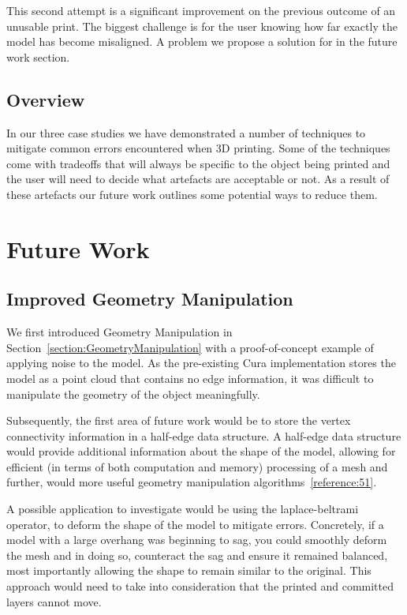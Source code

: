\documentclass[11pt]{report} %
\begin{document}
This second attempt is a significant improvement on the previous outcome of an unusable print. The biggest challenge is for the user knowing how far exactly the model has become misaligned. A problem we propose a solution for in the future work section.   


\section{Overview}
In our three case studies we have demonstrated a number of techniques to mitigate common errors encountered when 3D printing.  Some of the techniques come with tradeoffs that will always be specific to the object being printed and the user will need to decide what artefacts are acceptable or not. As a result of these artefacts our future work outlines some potential ways to reduce them.  




\chapter{Future Work}
\section{Improved Geometry Manipulation}
We first introduced Geometry Manipulation in Section~\ref{section:GeometryManipulation} with a proof-of-concept example of applying noise to the model. As the pre-existing Cura implementation stores the model as a point cloud that contains no edge information, it was difficult to manipulate the geometry of the object meaningfully. 

Subsequently, the first area of future work would be to store the vertex connectivity information in a half-edge data structure. A half-edge data structure would provide additional information about the shape of the model, allowing for efficient (in terms of both computation and memory) processing of a mesh and further, would more useful geometry manipulation algorithms~\ref{reference:51}.

A possible application to investigate would be using the laplace-beltrami operator, to deform the shape of the model to mitigate errors. Concretely, if a model with a large overhang was beginning to sag, you could smoothly deform the mesh and in doing so, counteract the sag and ensure it remained balanced, most importantly allowing the shape to remain similar to the original. This approach would need to take into consideration that the printed and committed layers cannot move. 
\end{document}
